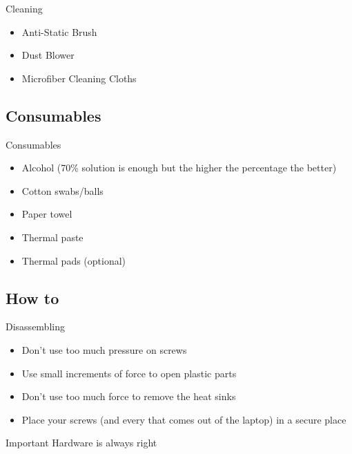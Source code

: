 \documentclass{beamer}
\begin{document}
\begin{frame}{Cleaning}
    \begin{itemize}
        \item Anti-Static Brush
        \item Dust Blower
        \item Microfiber Cleaning Cloths
    \end{itemize}
\end{frame}

\subsection{Consumables}

\begin{frame}{Consumables}
    \begin{itemize}
      \item Alcohol (70\% solution is enough but the higher the percentage the better)
      \item Cotton swabs/balls
      \item Paper towel
      \item Thermal paste
      \item Thermal pads (optional)
    \end{itemize}
\end{frame}

\subsection{How to}

\begin{frame}{Disassembling}
    \begin{itemize}
      \item Don't use too much pressure on screws
      \item Use small increments of force to open plastic parts
      \item Don't use too much force to remove the heat sinks
      \item Place your screws (and every that comes out of the laptop) in a secure place
    \end{itemize}
    \begin{alertblock}{Important}
        Hardware is always right
    \end{alertblock}
\end{frame}
\end{document}

